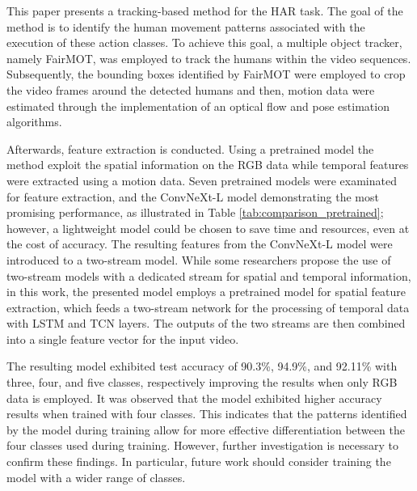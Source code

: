 \documentclass[mathematics,article,submit,pdftex,moreauthors]{Definitions/mdpi}
\begin{document}

This paper presents a tracking-based method for the HAR task. The goal of the method is to identify the human movement patterns associated with the execution of these action classes. To achieve this goal, a multiple object tracker, namely FairMOT, was employed to track the humans within the video sequences. Subsequently, the bounding boxes identified by FairMOT were employed to crop the video frames around the detected humans and then, motion data were estimated through the implementation of an optical flow and pose estimation algorithms. 

Afterwards, feature extraction is conducted. Using a pretrained model the method exploit the spatial information on the RGB data while temporal features were extracted using a motion data. Seven pretrained models were examinated for feature extraction, and the ConvNeXt-L model demonstrating the most promising performance, as illustrated in Table \ref{tab:comparison_pretrained}; however, a lightweight model could be chosen to save time and resources, even at the cost of accuracy.
The resulting features from the ConvNeXt-L model were introduced to a two-stream model. While some researchers propose the use of two-stream models with a dedicated stream for spatial and temporal information, in this work, the presented model employs a pretrained model for spatial feature extraction, which feeds a two-stream network for the processing of temporal data with LSTM and TCN layers. The outputs of the two streams are then combined into a single feature vector for the input video. 

The resulting model exhibited test accuracy of 90.3\%, 94.9\%, and 92.11\% with three, four, and five classes, respectively improving the results when only RGB data is employed. It was observed that the model exhibited higher accuracy results when trained with four classes. This indicates that the patterns identified by the model during training allow for more effective differentiation between the four classes used during training. However, further investigation is necessary to confirm these findings. In particular, future work should consider training the model with a wider range of classes.
\end{document}
